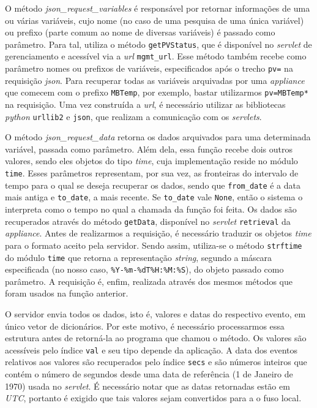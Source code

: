 \vspace{12pt}

O método \textit{json\_request\_variables} é responsável por retornar
informações de uma ou várias variáveis, cujo nome (no caso de uma pesquisa de
uma única variável) ou prefixo (parte comum ao nome de diversas variáveis) é
passado como parâmetro. Para tal, utiliza o método \texttt{getPVStatus}, que é
disponível no \textit{servlet} de gerenciamento e acessível via a \textit{url}
\texttt{mgmt\_url}. Esse método também recebe como parâmetro nomes ou prefixos
de variáveis, especificados após o trecho \texttt{pv=} na requisição
\textit{json}. Para recuperar todas as variáveis arquivadas por uma
\textit{appliance} que comecem com o prefixo \texttt{MBTemp}, por exemplo,
bastar utilizarmos \texttt{pv=MBTemp*} na requisição. Uma vez construída a
\textit{url}, é necessário utilizar as bibliotecas \textit{python}
\texttt{urllib2} e \texttt{json}, que realizam a comunicação com os
\textit{servlets}. 

\vspace{12pt}

O método \textit{json\_request\_data} retorna os dados arquivados para uma
determinada variável, passada como parâmetro. Além dela, essa função recebe dois
outros valores, sendo eles objetos do tipo \textit{time}, cuja implementação
reside no módulo \texttt{time}. Esses parâmetros representam, por sua vez, as
fronteiras do intervalo de tempo para o qual se deseja recuperar os dados, sendo
que \texttt{from\_date} é a data mais antiga e \texttt{to\_date}, a mais
recente. Se \texttt{to\_date} vale \texttt{None}, então o sistema o interpreta
como o tempo no qual a chamada da função foi feita. Os dados são recuperados
através do método \texttt{getData}, disponível no \textit{servlet}
\texttt{retrieval} da \textit{appliance}. Antes de realizarmos a requisição, é
necessário traduzir os objetos \textit{time} para o formato aceito pela
servidor. Sendo assim, utiliza-se o método \texttt{strftime} do módulo
\texttt{time} que retorna a representação \textit{string}, segundo a máscara
especificada (no nosso caso, \texttt{\%Y-\%m-\%dT\%H:\%M:\%S}), do objeto
passado como parâmetro. A requisição é, enfim, realizada através dos mesmos
métodos que foram usados na função anterior.

\vspace{12pt}

O servidor envia todos os dados, isto é, valores e datas do respectivo evento,
em único vetor de dicionários. Por este motivo, é necessário processarmos essa
estrutura antes de retorná-la ao programa que chamou o método. Os valores são
acessíveis pelo índice \texttt{val} e seu tipo depende da aplicação. A data dos
eventos relativos aos valores são recuperados pelo índice \texttt{secs} e são
números inteiros que contém o número de segundos desde uma data de referência
(1 de Janeiro de 1970) usada no \textit{servlet}. É necessário notar que as
datas retornadas estão em \textit{UTC}, portanto é exigido que tais
valores sejam convertidos para a o fuso local.

